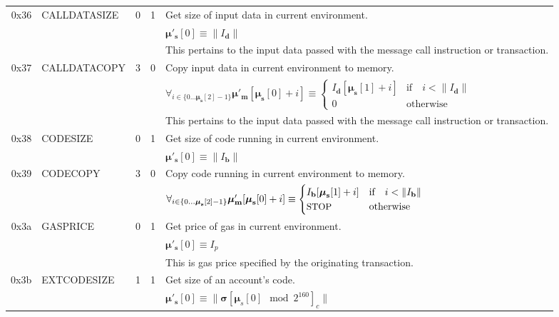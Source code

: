 \documentclass[9pt,oneside]{amsart}
\begin{document}
\begin{tabular*}{\columnwidth}[h]{rlrrl}
\midrule
0x36 & {\small CALLDATASIZE} & 0 & 1 & Get size of input data in current environment. \\
&&&& $\boldsymbol{\mu}'_\mathbf{s}[0] \equiv \lVert I_\mathbf{d} \rVert$ \\
&&&& This pertains to the input data passed with the message call instruction or transaction. \\
\midrule
0x37 & {\small CALLDATACOPY} & 3 & 0 & Copy input data in current environment to memory. \\
&&&& $\forall_{i \in \{ 0 \dots \boldsymbol{\mu}_\mathbf{s}[2] - 1\} } \boldsymbol{\mu}'_\mathbf{m}[\boldsymbol{\mu}_\mathbf{s}[0] + i ] \equiv
\begin{cases} I_\mathbf{d}[\boldsymbol{\mu}_\mathbf{s}[1] + i] & \text{if} \quad i < \lVert I_\mathbf{d} \rVert \\ 0 & \text{otherwise} \end{cases}$\\
&&&& This pertains to the input data passed with the message call instruction or transaction. \\
\midrule
0x38 & {\small CODESIZE} & 0 & 1 & Get size of code running in current environment. \\
&&&& $\boldsymbol{\mu}'_\mathbf{s}[0] \equiv \lVert I_\mathbf{b} \rVert$ \\
\midrule
0x39 & {\small CODECOPY} & 3 & 0 & Copy code running in current environment to memory. \\
&&&& $\forall_{i \in \{ 0 \dots \boldsymbol{\mu}_\mathbf{s}[2] - 1\} } \boldsymbol{\mu}'_\mathbf{m}[\boldsymbol{\mu}_\mathbf{s}[0] + i ] \equiv
\begin{cases} I_\mathbf{b}[\boldsymbol{\mu}_\mathbf{s}[1] + i] & \text{if} \quad i < \lVert I_\mathbf{b} \rVert \\ \text{\small STOP} & \text{otherwise} \end{cases}$\\
\midrule
0x3a & {\small GASPRICE} & 0 & 1 & Get price of gas in current environment. \\
&&&& $\boldsymbol{\mu}'_\mathbf{s}[0] \equiv I_p$ \\
&&&& This is gas price specified by the originating transaction.\\
\midrule
0x3b & {\small EXTCODESIZE} & 1 & 1 & Get size of an account's code. \\
&&&& $\boldsymbol{\mu}'_\mathbf{s}[0] \equiv \lVert \boldsymbol{\sigma}[\boldsymbol{\mu}_s[0] \mod 2^{160}]_c \rVert$ \\
\midrule

\end{tabular*}
\end{document}
